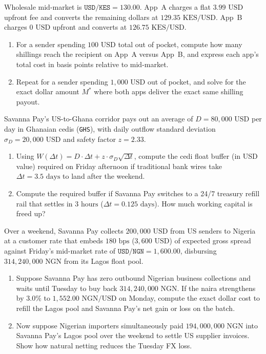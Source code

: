 \begin{exercise}
Wholesale mid-market is $\texttt{USD/KES} = 130.00$. App~A charges a flat $3.99\text{ USD}$ upfront fee and converts the remaining dollars at $129.35\text{ KES/USD}$. App~B charges $0\text{ USD}$ upfront and converts at $126.75\text{ KES/USD}$.
\begin{enumerate}
  \item For a sender spending $100\text{ USD}$ total out of pocket, compute how many shillings reach the recipient on App~A versus App~B, and express each app's total cost in basis points relative to mid-market.
  \item Repeat for a sender spending $1{,}000\text{ USD}$ out of pocket, and solve for the exact dollar amount $M^*$ where both apps deliver the exact same shilling payout.
\end{enumerate}
\end{exercise}

\begin{exercise}
Savanna Pay's US-to-Ghana corridor pays out an average of $D = 80{,}000\text{ USD}$ per day in Ghanaian cedis (\texttt{GHS}), with daily outflow standard deviation $\sigma_D = 20{,}000\text{ USD}$ and safety factor $z = 2.33$.
\begin{enumerate}
  \item Using $W(\Delta t) = D \cdot \Delta t + z \cdot \sigma_D \sqrt{\Delta t}$, compute the cedi float buffer (in USD value) required on Friday afternoon if traditional bank wires take $\Delta t = 3.5\text{ days}$ to land after the weekend.
  \item Compute the required buffer if Savanna Pay switches to a 24/7 treasury refill rail that settles in $3\text{ hours}$ ($\Delta t = 0.125\text{ days}$). How much working capital is freed up?
\end{enumerate}
\end{exercise}

\begin{exercise}
Over a weekend, Savanna Pay collects $200{,}000\text{ USD}$ from US senders to Nigeria at a customer rate that embeds $180\text{ bps}$ ($3{,}600\text{ USD}$) of expected gross spread against Friday's mid-market rate of $\texttt{USD/NGN} = 1{,}600.00$, disbursing $314{,}240{,}000\text{ NGN}$ from its Lagos float pool.
\begin{enumerate}
  \item Suppose Savanna Pay has zero outbound Nigerian business collections and waits until Tuesday to buy back $314{,}240{,}000\text{ NGN}$. If the naira strengthens by $3.0\%$ to $1{,}552.00\text{ NGN/USD}$ on Monday, compute the exact dollar cost to refill the Lagos pool and Savanna Pay's net gain or loss on the batch.
  \item Now suppose Nigerian importers simultaneously paid $194{,}000{,}000\text{ NGN}$ into Savanna Pay's Lagos pool over the weekend to settle US supplier invoices. Show how natural netting reduces the Tuesday FX loss.
\end{enumerate}
\end{exercise}
